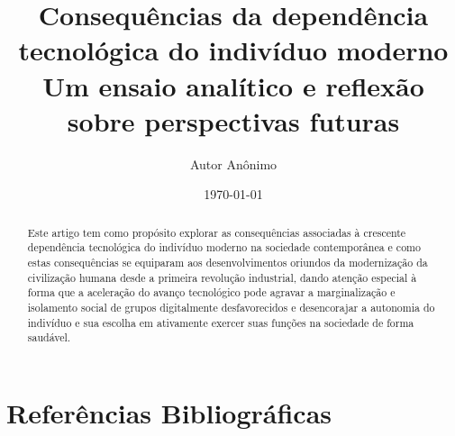 \documentclass[12pt]{article}
\title{%
  Consequências da dependência tecnológica do indivíduo moderno\\
  \large Um ensaio analítico e reflexão sobre perspectivas futuras
}
\author[1]{Autor Anônimo}
\date{\today}
\affil[1]{Departamento de Informática e Estatística, Universidade Federal de Santa Catarina}
\begin{document}
\begin{titlepage}
\maketitle
\thispagestyle{empty}

\begin{abstract}
  Este artigo tem como propósito explorar as consequências associadas à crescente dependência tecnológica do indivíduo
  moderno na sociedade contemporânea e como estas consequências se equiparam aos desenvolvimentos oriundos da
  modernização da civilização humana desde a primeira revolução industrial, dando atenção especial à forma que a aceleração 
  do avanço tecnológico pode agravar a marginalização e isolamento social de grupos digitalmente desfavorecidos e desencorajar a 
  autonomia do indivíduo e sua escolha em ativamente exercer suas funções na sociedade de forma saudável.
\end{abstract}

\end{titlepage}

\tableofcontents

\printglossary[title=Glossário, toctitle=Glossário]

\newpage





\newpage
\section{Referências Bibliográficas}


\end{document}
